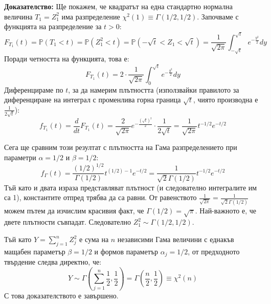 \documentclass{article}
\begin{document}
\textbf{Доказателство:} Ще покажем, че квадратът на една стандартно нормална величина $T_1 = Z_1^2$ има разпределение $\chi^2(1) \equiv \Gamma(1/2, 1/2)$. 
Започваме с функцията на разпределение за $t > 0$:
\[
F_{T_1}(t) = \mathbb{P}(T_1 < t) = \mathbb{P}(Z_1^2 < t) = \mathbb{P}(-\sqrt{t} < Z_1 < \sqrt{t}) = \frac{1}{\sqrt{2\pi}} \int_{-\sqrt{t}}^{\sqrt{t}} e^{-\frac{y^2}{2}} dy
\]
Поради четността на функцията, това е:
\[
F_{T_1}(t) = 2 \cdot \frac{1}{\sqrt{2\pi}} \int_{0}^{\sqrt{t}} e^{-\frac{y^2}{2}} dy
\]
Диференцираме по $t$, за да намерим плътността (използвайки правилото за диференциране на интеграл с променлива горна граница $\sqrt{t}$, чиято производна е $\frac{1}{2\sqrt{t}}$):
\[
f_{T_1}(t) = \frac{d}{dt} F_{T_1}(t) = \frac{2}{\sqrt{2\pi}} e^{-\frac{(\sqrt{t})^2}{2}} \cdot \frac{1}{2\sqrt{t}} = \frac{1}{\sqrt{2\pi}} t^{-1/2} e^{-t/2}
\]

Сега ще сравним този резултат с плътността на Гама разпределението при параметри $\alpha = 1/2$ и $\beta = 1/2$:
\[
f_\Gamma(t) = \frac{(1/2)^{1/2}}{\Gamma(1/2)} t^{(1/2) - 1} e^{-t/2} = \frac{1}{\sqrt{2}\Gamma(1/2)} t^{-1/2} e^{-t/2}
\]
Тъй като и двата израза представляват плътност (и следователно интегралите им са 1), константите отпред трябва да са равни. От равенството $\frac{1}{\sqrt{2\pi}} = \frac{1}{\sqrt{2}\Gamma(1/2)}$ можем пътем да изчислим красивия факт, че $\Gamma(1/2) = \sqrt{\pi}$.
Най-важното е, че двете плътности съвпадат. Следователно $Z_1^2 \sim \Gamma(1/2, 1/2)$.

Тъй като $Y = \sum_{j=1}^n Z_j^2$ е сума на $n$ независими Гама величини с еднакъв мащабен параметър $\beta = 1/2$ и формов параметър $\alpha_j = 1/2$, от предходното твърдение следва директно, че:
\[
Y \sim \Gamma\left(\sum_{j=1}^n \frac{1}{2}, \frac{1}{2}\right) = \Gamma\left(\frac{n}{2}, \frac{1}{2}\right) \equiv \chi^2(n)
\]
С това доказателството е завършено.
\end{document}
